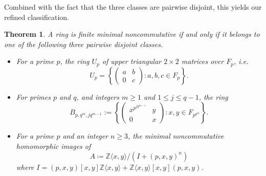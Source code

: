 \documentclass[11pt]{article}
\newtheorem{theorem}[corollary]{Theorem}
\theoremstyle{definition}
\begin{document}
Combined with the fact that the three classes are pairwise disjoint, this yields our refined classification.

\begin{theorem}\label{RefinedClassification}
A ring is finite minimal noncommutative if and only if it belongs to one of the following three pairwise disjoint classes.
\begin{itemize}[topsep=0pt]
\item[(1)] For a prime $p$, the ring $U_p$ of upper triangular $2\times 2$ matrices over $F_p$, i.e.
\[U_p=\left\lbrace\begin{pmatrix}
a&b\\
0&c
\end{pmatrix}
:a,b,c\in F_p\right\rbrace.\]
\item[(2)] For primes $p$ and $q$, and integers $m\geq 1$ and $1\leq j\leq q-1$, the ring
\[B_{p,q^m,jq^{m-1}}:=\left\lbrace\begin{pmatrix}
x^{p^{jq^{m-1}}}&y\\
0&x
\end{pmatrix}
:x,y\in F_{p^{q^m}}\right\rbrace.\]
\item[(3)] For a prime $p$ and an integer $n\geq3$, the minimal noncommutative homomorphic images of
\[A\coloneqq \mathbb{Z}\langle x,y\rangle/\left(I+(p,x,y)^n\right)\]
where $I=(p,x,y)[x,y]\mathbb{Z}\langle x,y\rangle+\mathbb{Z}\langle x,y\rangle[x,y](p,x,y)$.
\end{itemize}
\end{theorem}
\end{document}
